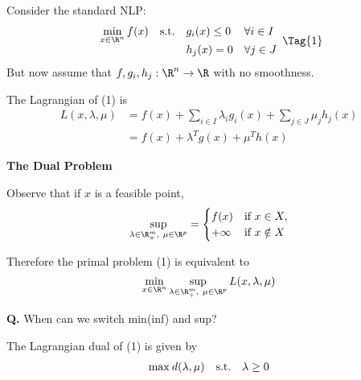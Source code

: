 


Consider the standard NLP:
\begin{equation*}
  \NlpStdForm\Tag{1}
\end{equation*}
But now assume that $f,g_i,h_j:\R^n\to\R$ with no smoothness.

The Lagrangian of (1) is
\begin{align*}
  L(x,\lambda,\mu)
   & =f(x)+\sum_{i\in I}\lambda_ig_i(x) + \sum_{j\in J}\mu_jh_j(x) \\
   & =f(x)+\lambda^Tg(x)+\mu^Th(x)
\end{align*}

\textbf{The Dual Problem}

Observe that if $x$ is a feasible point,
\begin{align*}
  \sup_{\lambda\in\R^m_+,\ \mu\in\R^p}=
  \begin{cases}
    f(x)    & \text{if }x\in X,   \\
    +\infty & \text{if }x\notin X
  \end{cases}
\end{align*}

%

Therefore the primal problem (1) is equivalent to
$$
  \min_{x\in\R^n}\sup_{\lambda\in\R^m_+,\ \mu\in\R^p}L(x,\lambda,\mu)
$$

\textbf{Q.} When can we switch min(inf) and sup?

\label{f6ab91b}

The Lagrangian dual of (1) is given by
$$
  \begin{array}{l l l l}
    \max_{}d(\lambda,\mu) & \text{s.t.} & \lambda\geq0
  \end{array}
$$

